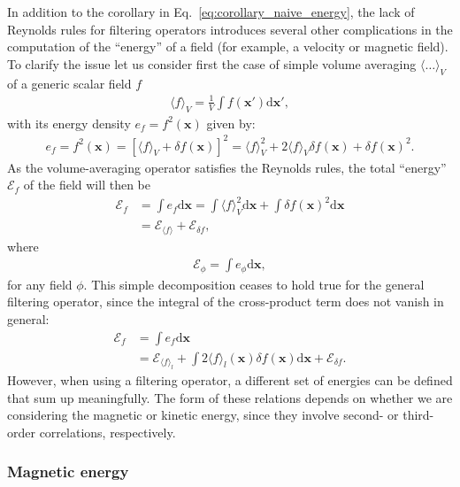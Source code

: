 \documentclass[]{article}
\begin{document}
In addition to the corollary in Eq.~\eqref{eq:corollary_naive_energy}, the lack of Reynolds rules for filtering operators introduces several other complications in the computation of the ``energy'' of a field (for example, a velocity or magnetic field). To clarify the issue let us consider first the case of simple volume averaging $\langle \ldots \rangle_V$ of a generic scalar field $f$
%
\begin{align}
	\langle f \rangle_V = \frac{1}{V} \int f(\bm x') \mathrm{d} \bm x',
\end{align}
%
with its energy density $e_f = f^2 (\bm x)$ given by:
%
\begin{align}
	e_f = f^2 (\bm x) = \left[\langle f \rangle_V + \delta f(\bm x) \right]^2 = \langle f \rangle_V ^2 + 2 \langle f \rangle_V \delta f(\bm x) +  \delta f(\bm x)^2.
\end{align}
%
As the volume-averaging operator satisfies the Reynolds rules, the total ``energy'' $\mathcal{E}_f$ of the field will then be
%
\begin{align}
	\mathcal{E}_f &= \int e_f \mathrm{d} \bm x = \int \langle f \rangle_V^2 \mathrm{d} \bm x + \int \delta f(\bm x)^2 \mathrm{d} \bm x \nonumber \\
	&= \mathcal{E}_{\langle f \rangle} + \mathcal{E}_{\delta f},
\end{align}
%
where 
%
\begin{align}
	\mathcal{E}_{\phi} = \int e_\phi \mathrm{d} \bm x,
\end{align}
%
for any field $\phi$. This simple decomposition ceases to hold true for the general filtering operator, since the integral of the cross-product term does not vanish in general:
%
\begin{align}
	\mathcal{E}_f &= \int e_f \mathrm{d} \bm x \nonumber \\
	&= 	\mathcal{E}_{\langle f \rangle_l} + \int 2 \langle f \rangle_l (\bm x) \delta f(\bm x) \mathrm{d} \bm x + \mathcal{E}_{\delta f}.
\end{align}
%
However, when using a filtering operator, a different set of energies can be defined that sum up meaningfully. The form of these relations depends on whether we are considering the magnetic or kinetic energy, since they involve second- or third-order correlations, respectively.

\subsubsection{Magnetic energy}
\end{document}
